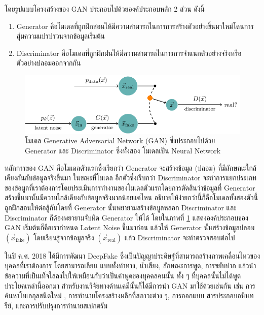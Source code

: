 \noindent โดยรูปแบบโครงสร้างของ GAN ประกอบไปด้วยองค์ประกอบหลัก 2 ส่วน ดังนี้

\begin{enumerate}
    \item Generator คือโมเดลที่ถูกฝึกสอนให้มีความสามารถในการการสร้างตัวอย่างขึ้นมาใหม่โดนการสุ่มความแปรปรวนจากข้อมูลเริ่มต้น
    \item Discriminator คือโมเดลที่ถูกฝึกฝนให้มีความสามารถในการการจำแนกตัวอย่างจริงหรือตัวอย่างปลอมออกจากกัน
\end{enumerate}

\begin{figure}[htbp]
    \includegraphics[width=\linewidth]{fig/generative_adversarial_nets.pdf}
    \caption{โมเดล Generative Adversarial Network (GAN) ซึ่งประกอบไปด้วย Generator และ Discriminator ซึ่งทั้งสอง%
    โมเดลเป็น Neural Network}
    \label{fig:gan}
\end{figure}

หลักการของ GAN คือโมเดลตัวแรกซึ่งเรียกว่า Generator จะสร้างข้อมูล (ปลอม) ที่มีลักษณะใกล้เคียงกันกับข้อมูลจริงขึ้นมา ในขณะที่โมเดล%
อีกตัวซึ่งเรีบกว่า Discriminator จะทำการแยกประเภทของข้อมูลที่เราต้องการโดยประเมินการทำงานของโมเดลตัวแรกโดยการตัดสินว่าข้อมูลที่ 
Generator สร้างขึ้นมานั้นมีความใกล้เคียงกับข้อมูลจริงมากน้อยแค่ไหน อธิบายให้ง่ายกว่านี้ก็คือโมเดลทั้งสองตัวนี้ถูกฝึกสอนให้ต่อสู้กันโดยที่
Generator นั้นพยายามสร้างข้อมูลหลอก Discriminator และ Discriminator ก็ต้องพยายามจับผิด Generator ให้ได้ โดยในภาพที่ 
\ref{fig:gan} แสดงองค์ประกอบของ GAN เริ่มต้นก็คือเรากำหนด Latent Noise ขึ้นมาก่อน แล้วให้ Generator นั้นสร้างข้อมูลปลอม 
$(\vec{x}_{\text{fake}})$ โดยเรียนรู้จากข้อมูลจริง $(\vec{x}_{\text{real}})$ แล้ว Discriminator จะทำตรวจสอบต่อไป

ในปี ค.ศ. 2018 ได้มีการพัฒนา DeepFake ซึ่งเป็นปัญญาประดิษฐ์ที่สามารถสร้างภาพเคลื่อนไหวของบุคคลที่เราต้องการ โดยสามารถเลียน%
แบบทั้งท่าทาง, น้ำเสียง, ลักษณะการพูด, การขยับปาก แล้วนำข้อความที่เป็นเท็จใส่ลงไปให้เหมือนกับว่าเป็นคำพูดของบุคคลคนนั้น ทั้ง ๆ 
ที่บุคคลนั้นไม่ได้พูดประโยคเหล่านี้ออกมา สำหรับงานวิจัยทางด้านเคมีนั้นก็ได้มีการนำ GAN มาใช้ด้วยเช่นกัน เช่น การค้นหาโมเลกุลชนิดใหม่%
\autocite{prykhodko2019,lee2021,blanchard2021}, การทำนายโครงสร้างผลึกที่สภาวะต่าง ๆ\autocite{kim2020}, การออกแบบ%
สารประกอบอนินทรีย์\autocite{dan2020}, และการปรับปรุงการทำนายสเปกตรัม\autocite{al-mualem2022}

